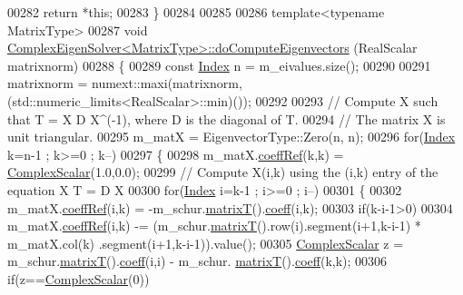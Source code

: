 \begin{DoxyCode}
00282   \textcolor{keywordflow}{return} *\textcolor{keyword}{this};
00283 \}
00284 
00285 
00286 \textcolor{keyword}{template}<\textcolor{keyword}{typename} MatrixType>
00287 \textcolor{keywordtype}{void} \hyperlink{group___eigenvalues___module_class_eigen_1_1_complex_eigen_solver}{ComplexEigenSolver<MatrixType>::doComputeEigenvectors}
      (RealScalar matrixnorm)
00288 \{
00289   \textcolor{keyword}{const} \hyperlink{group___eigenvalues___module_abc0218d8b902af0d6c759bfc0a8a8d74}{Index} n = m\_eivalues.size();
00290 
00291   matrixnorm = numext::maxi(matrixnorm,(std::numeric\_limits<RealScalar>::min)());
00292 
00293   \textcolor{comment}{// Compute X such that T = X D X^(-1), where D is the diagonal of T.}
00294   \textcolor{comment}{// The matrix X is unit triangular.}
00295   m\_matX = EigenvectorType::Zero(n, n);
00296   \textcolor{keywordflow}{for}(\hyperlink{group___eigenvalues___module_abc0218d8b902af0d6c759bfc0a8a8d74}{Index} k=n-1 ; k>=0 ; k--)
00297   \{
00298     m\_matX.\hyperlink{class_eigen_1_1_plain_object_base_a25626a55b26a4323565f79d1b7c48ea8}{coeffRef}(k,k) = \hyperlink{group___eigenvalues___module_a3604c99a69fac3bee42c88cb2b589143}{ComplexScalar}(1.0,0.0);
00299     \textcolor{comment}{// Compute X(i,k) using the (i,k) entry of the equation X T = D X}
00300     \textcolor{keywordflow}{for}(\hyperlink{group___eigenvalues___module_abc0218d8b902af0d6c759bfc0a8a8d74}{Index} i=k-1 ; i>=0 ; i--)
00301     \{
00302       m\_matX.\hyperlink{class_eigen_1_1_plain_object_base_a25626a55b26a4323565f79d1b7c48ea8}{coeffRef}(i,k) = -m\_schur.\hyperlink{group___eigenvalues___module_add3ab5ed83f7f2f06b79fa910a2d5684}{matrixT}().\hyperlink{class_eigen_1_1_plain_object_base_afbfc12954f16d21aedb7bd839f64a278}{coeff}(i,k);
00303       \textcolor{keywordflow}{if}(k-i-1>0)
00304         m\_matX.\hyperlink{class_eigen_1_1_plain_object_base_a25626a55b26a4323565f79d1b7c48ea8}{coeffRef}(i,k) -= (m\_schur.\hyperlink{group___eigenvalues___module_add3ab5ed83f7f2f06b79fa910a2d5684}{matrixT}().row(i).segment(i+1,k-i-1) * m\_matX.col(k)
      .segment(i+1,k-i-1)).value();
00305       \hyperlink{group___eigenvalues___module_a3604c99a69fac3bee42c88cb2b589143}{ComplexScalar} z = m\_schur.\hyperlink{group___eigenvalues___module_add3ab5ed83f7f2f06b79fa910a2d5684}{matrixT}().\hyperlink{class_eigen_1_1_plain_object_base_afbfc12954f16d21aedb7bd839f64a278}{coeff}(i,i) - m\_schur.
      \hyperlink{group___eigenvalues___module_add3ab5ed83f7f2f06b79fa910a2d5684}{matrixT}().\hyperlink{class_eigen_1_1_plain_object_base_afbfc12954f16d21aedb7bd839f64a278}{coeff}(k,k);
00306       \textcolor{keywordflow}{if}(z==\hyperlink{group___eigenvalues___module_a3604c99a69fac3bee42c88cb2b589143}{ComplexScalar}(0))

\end{DoxyCode}
